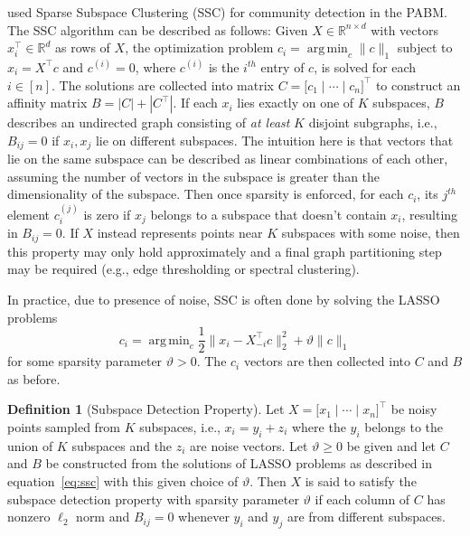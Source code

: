 \documentclass[
  12pt,
]{article}
\theoremstyle{definition}
\newtheorem{definition}{Definition}[section]
\theoremstyle{definition}
\theoremstyle{definition}
\theoremstyle{definition}
\theoremstyle{remark}
\begin{document}
\cite{noroozi2019estimation} used Sparse Subspace Clustering (SSC)
\citep{5206547} for community detection in the PABM.
The SSC algorithm can be described as follows:
Given \(X \in \mathbb{R}^{n \times d}\) with vectors
\(x_i^\top \in \mathbb{R}^d\) as rows of \(X\), the optimization problem
\(c_i = \mathop{\mathrm{arg\,min}}_{c} \|c\|_1\) subject to \(x_i = X^\top c\) and
\(c^{(i)} = 0\), where \(c^{(i)}\) is the \(i^{th}\) entry of \(c\), is solved for each \(i \in [n]\).
The solutions are collected into matrix
\(C = \bigl[ c_1 \mid \cdots \mid c_n \bigr]^\top\) to
construct an affinity matrix \(B = |C| + |C^\top|\). If each \(x_i\) lies
exactly on one of \(K\) subspaces, \(B\) describes an undirected graph
consisting of \emph{at least} \(K\) disjoint subgraphs, i.e., \(B_{ij} = 0\) if \(x_i, x_j\) lie on different subspaces.
The intuition here is that vectors that lie on the same subspace can be described as linear combinations of each other, assuming the number of vectors in the subspace is greater than the dimensionality of the subspace.
Then once sparsity is enforced, for each \(c_i\), its \(j^{th}\) element \(c_i^{(j)}\) is zero if \(x_j\) belongs to a subspace that doesn't contain \(x_i\), resulting in \(B_{ij} = 0\).
If \(X\) instead represents points near \(K\) subspaces with some noise,
then this property may only hold approximately and a final graph partitioning step may be required
(e.g., edge thresholding or spectral clustering).

In practice, due to presence of noise, SSC is often done by solving the LASSO problems
\begin{equation} 
\label{eq:ssc}
c_i = \mathop{\mathrm{arg\,min}}_c \frac{1}{2} \|x_i - X_{-i}^\top c\|^2_2 + \vartheta \|c\|_1
\end{equation}
for some sparsity parameter \(\vartheta > 0\).
The \(c_i\) vectors are then collected into \(C\) and \(B\) as before.

\begin{definition}[Subspace Detection Property]
\label{def:subspace_detection}
Let $X = \bigl[ x_1 \mid \cdots \mid x_n \bigr]^\top$ be noisy points sampled from $K$ subspaces, i.e., $x_i = y_i + z_i$ where the $y_i$ belongs to the union of $K$ subspaces and the $z_i$ are noise vectors. 
Let $\vartheta \geq 0$ be given and let $C$ and $B$ be constructed from the solutions of LASSO problems as described in equation~\eqref{eq:ssc} with this given choice of $\vartheta$. 
Then $X$ is said to satisfy the subspace detection property with sparsity parameter $\vartheta$ if each column of $C$ has nonzero $\ell_2$ norm and $B_{ij} = 0$ whenever $y_i$ and $y_j$ are from different subspaces.
\end{definition}
\end{document}
